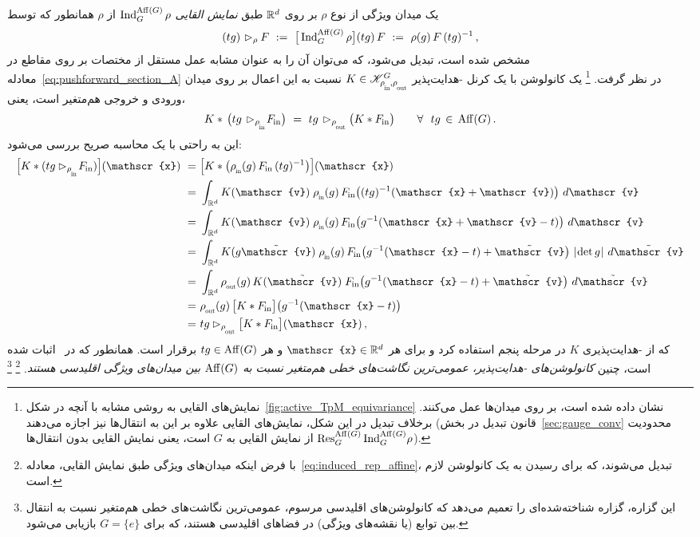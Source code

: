 یک میدان ویژگی از نوع $\rho$ بر روی $\mathbb{R}^d$ طبق \emph{نمایش القایی} $\operatorname{Ind}_G^{\operatorname{Aff}(G)} \rho$ از $\rho$ همانطور که توسط
\begin{align}\label{eq:induced_rep_affine}
	(tg) \mkern2mu\rhd_\rho F \ :=\ \big[\operatorname{Ind}_G^{\operatorname{Aff}(G)} \rho\big](tg)\, F \ :=\ \rho(g)\, F\, (tg)^{-1} \,,
\end{align}
مشخص شده است، تبدیل می‌شود، که می‌توان آن را به عنوان مشابه عمل مستقل از مختصات بر روی مقاطع در معادله~\eqref{eq:pushforward_section_A} در نظر گرفت.%
\footnote{
	نمایش‌های القایی به روشی مشابه با آنچه در شکل~\ref{fig:active_TpM_equivariance} نشان داده شده است، بر روی میدان‌ها عمل می‌کنند.
	برخلاف تبدیل در این شکل، نمایش‌های القایی علاوه بر این به انتقال‌ها نیز اجازه می‌دهند (قانون تبدیل در بخش~\ref{sec:gauge_conv} محدودیت $\operatorname{Res}_G^{\operatorname{Aff}(G)}\operatorname{Ind}_G^{\operatorname{Aff}(G)}\!\rho$ از نمایش القایی به $G$ است، یعنی نمایش القایی بدون انتقال‌ها).
}
یک کانولوشن با یک کرنل -هدایت‌پذیر $K \in \KG$ نسبت به این اعمال بر روی میدان ورودی و خروجی هم‌متغیر است، یعنی،
\begin{align}\label{eq:Euclidean_conv_equiv_in_coords_Rd}
	K *\, \big(tg \,\rhd_{\rhoin}\! \Fin \big)\ =\ tg \,\rhd_{\rhoout} \big( K*\Fin \big) \qquad \forall\ \ tg \,\in\, \Aff(G) \,.
\end{align}
این به راحتی با یک محاسبه صریح بررسی می‌شود:
\begin{align}
	\pig[ K * (tg \rhd_{\rhoin}\! \Fin) \pig] (\mathscr{x})
	\ =&\ \pig[ K * \big(\rhoin(g)\, \Fin\, (tg)^{-1}\big) \pig] (\mathscr{x}) \notag \\
	\ =&\ \int_{\R^d} K(\mathscr{v})\; \rhoin(g)\, \Fin \big((tg)^{-1} (\mathscr{x} + \mathscr{v}) \big)\ d\mathscr{v} \notag \\
	\ =&\ \int_{\R^d} K(\mathscr{v})\; \rhoin(g)\, \Fin \big(g^{-1}( \mathscr{x} + \mathscr{v} - t)\big)\ d\mathscr{v} \notag \\
	\ =&\ \int_{\R^d} K(g \tilde{\mathscr{v}})\; \rhoin(g)\, \Fin \big(g^{-1}(\mathscr{x} - t) + \tilde{\mathscr{v}}\big)\ \detg\ d\tilde{\mathscr{v}} \notag \\
	\ =&\ \int_{\R^d} \rhoout(g)\, K(\tilde{\mathscr{v}})\; \Fin \big(g^{-1}(\mathscr{x} - t) + \tilde{\mathscr{v}}\big)\ d\tilde{\mathscr{v}} \notag \\
	\ =&\ \rhoout(g)\, \big[ K * \Fin \big] \big(g^{-1}(\mathscr{x}-t)\big) \notag \\
	\ =&\ tg \rhd_{\rhoout} \big[K * \Fin \big] (\mathscr{x}) \,,
\end{align}
که از -هدایت‌پذیری $K$ در مرحله پنجم استفاده کرد و برای هر $\mathscr{x} \in \R^d$ و هر $tg\in \operatorname{Aff}(G)$ برقرار است.
همانطور که در~\cite{3d_steerableCNNs} اثبات شده است، چنین
\emph{کانولوشن‌های -هدایت‌پذیر، عمومی‌ترین نگاشت‌های خطی هم‌متغیر نسبت به $\operatorname{Aff}(G)$ بین میدان‌های ویژگی اقلیدسی هستند}.%
\footnote{
	با فرض اینکه میدان‌های ویژگی طبق نمایش القایی، معادله~\eqref{eq:induced_rep_affine}، تبدیل می‌شوند، که برای رسیدن به یک کانولوشن لازم است.
}%
\footnote{
	این گزاره، گزاره شناخته‌شده‌ای را تعمیم می‌دهد که کانولوشن‌های اقلیدسی مرسوم، عمومی‌ترین نگاشت‌های خطی هم‌متغیر نسبت به انتقال بین توابع (یا نقشه‌های ویژگی) در فضاهای اقلیدسی هستند، که برای $G=\{e\}$ بازیابی می‌شود.
}




